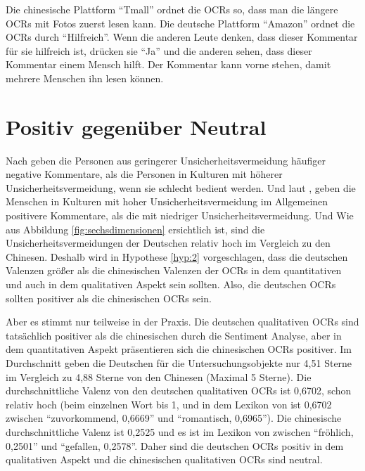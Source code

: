 Die chinesische Plattform ``Tmall'' ordnet die \ac{OCRs} so, dass man die längere \ac{OCRs} mit Fotos zuerst lesen kann. Die deutsche Plattform ``Amazon'' ordnet die \ac{OCRs} durch ``Hilfreich''. Wenn die anderen Leute denken, dass dieser Kommentar für sie hilfreich ist, drücken sie ``Ja'' und die anderen sehen, dass dieser Kommentar einem Mensch hilft. Der Kommentar kann vorne stehen, damit mehrere Menschen ihn lesen können.
\section{Positiv gegenüber Neutral} \label{sec:diskussion:2}
Nach \citet{liu2001relationships} geben die Personen aus geringerer Unsicherheitsvermeidung häufiger negative Kommentare, als die Personen in Kulturen mit höherer Unsicherheitsvermeidung, wenn sie schlecht bedient werden. Und laut \citet{donthu1998cultural}, geben die Menschen in Kulturen mit hoher Unsicherheitsvermeidung im Allgemeinen positivere Kommentare, als die mit niedriger Unsicherheitsvermeidung. Und Wie aus Abbildung \ref{fig:sechsdimensionen} ersichtlich ist, sind die Unsicherheitsvermeidungen der Deutschen relativ hoch im Vergleich zu den Chinesen. Deshalb wird in Hypothese \ref{hyp:2} vorgeschlagen, dass die deutschen Valenzen größer als die chinesischen Valenzen der \ac{OCRs} in dem quantitativen und auch in dem qualitativen Aspekt sein sollten. Also, die deutschen \ac{OCRs} sollten positiver als die chinesischen \ac{OCRs} sein.

Aber es stimmt nur teilweise in der Praxis. Die deutschen qualitativen \ac{OCRs} sind tatsächlich positiver als die chinesischen durch die Sentiment Analyse, aber in dem quantitativen Aspekt präsentieren sich die chinesischen \ac{OCRs} positiver. Im Durchschnitt geben die Deutschen für die Untersuchungsobjekte nur 4,51 Sterne im Vergleich zu 4,88 Sterne von den Chinesen (Maximal 5 Sterne). Die durchschnittliche Valenz von den deutschen qualitativen \ac{OCRs} ist 0,6702, schon relativ hoch (beim einzelnen Wort bis 1, und in dem Lexikon von \citet{Remus2010} ist 0,6702 zwischen ``zuvorkommend, 0,6669'' und ``romantisch, 0,6965''). Die chinesische durchschnittliche Valenz ist 0,2525 und es ist im Lexikon von \citet{Remus2010} zwischen ``fröhlich, 0,2501'' und ``gefallen, 0,2578''. Daher sind die deutschen \ac{OCRs} positiv in dem qualitativen Aspekt und die chinesischen qualitativen \ac{OCRs} sind neutral.

